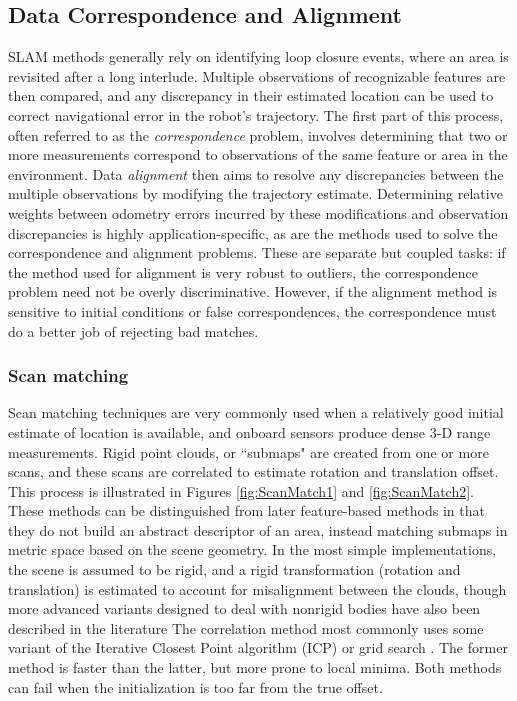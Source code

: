 \subsection{Data Correspondence and Alignment}

SLAM methods generally rely on identifying loop closure events, where an area is revisited after a long interlude. Multiple observations of recognizable features are then compared, and any discrepancy in their estimated location can be used to correct navigational error in the robot's trajectory. The first part of this process, often referred to as the \emph{correspondence} problem, involves determining that two or more measurements correspond to observations of the same feature or area in the environment. Data \emph{alignment} then aims to resolve any discrepancies between the multiple observations by modifying the trajectory estimate. Determining relative weights between odometry errors incurred by these modifications and observation discrepancies is highly application-specific, as are the methods used to solve the correspondence and alignment problems. These are separate but coupled tasks: if the method used for alignment is very robust to outliers, the correspondence problem need not be overly discriminative. However, if the alignment method is sensitive to initial conditions or false correspondences, the correspondence must do a better job of rejecting bad matches. 


\subsubsection{Scan matching}

Scan matching techniques are very commonly used when a relatively good initial estimate of location is available, and onboard sensors produce dense 3-D range measurements. Rigid point clouds, or ``submaps" are created from one or more scans, and these scans are correlated to estimate rotation and translation offset. This process is illustrated in Figures \ref{fig:ScanMatch1} and \ref{fig:ScanMatch2}. These methods can be distinguished from later feature-based methods in that they do not build an abstract descriptor of an area, instead matching submaps in metric space based on the scene geometry. In the most simple implementations, the scene is assumed to be rigid, and a rigid transformation (rotation and translation) is estimated to account for misalignment between the clouds, though more advanced variants designed to deal with nonrigid bodies have also been described in the literature \cite{Amberg2007, Feldmar1996,Haehnel2003} The correlation method most commonly uses some variant of the Iterative Closest Point algorithm (ICP) \cite{Besl1992} or grid search \cite{Miller2013}. The former method is faster than the latter, but more prone to local minima. Both methods can fail when the initialization is too far from the true offset. 

